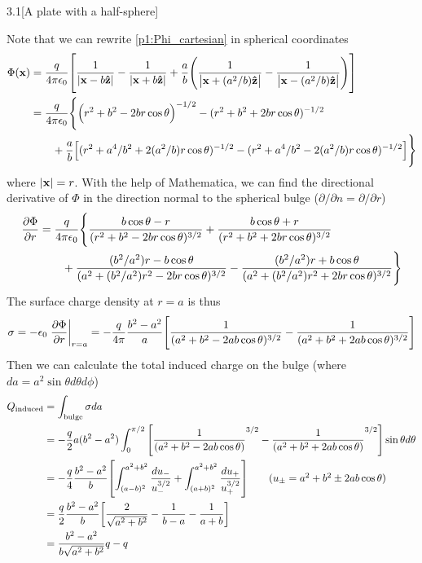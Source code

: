 \documentclass[12pt]{article}
\begin{document}
\begin{problem}{3.1}[A plate with a half-sphere]
\begin{solution}
Note that we can rewrite \eqref{p1:Phi_cartesian} in spherical coordinates
\begin{align}
    \Phi(\vb{x})&=\frac{q}{4\pi\epsilon_0}\qty[
        \frac1{\abs{\vb{x}-b\vb{\hat{z}}}}-\frac1{\abs{\vb{x}+b\vb{\hat{z}}}}
        +\frac{a}{b}\qty(
            \frac{1}{\abs{\vb{x}+(a^2/b)\vb{\hat{z}}}}
            -\frac{1}{\abs{\vb{x}-(a^2/b)\vb{\hat{z}}}}
        )
    ]\notag\\
    &=\frac{q}{4\pi\epsilon_0}\Bigg\{
        \qty(r^2+b^2-2br\cos\theta)^{-1/2}-(r^2+b^2+2br\cos\theta)^{-1/2}\notag\\
    &\qquad+\frac{a}{b}\qty[
        (r^2+a^4/b^2+2(a^2/b)r\cos\theta)^{-1/2}
        -(r^2+a^4/b^2-2(a^2/b)r\cos\theta)^{-1/2}
    ]
    \Bigg\}
\end{align}
where $\abs{\vb{x}}=r$. With the help of Mathematica, we can find the
directional derivative of $\Phi$ in the direction normal to the spherical bulge
($\partial/\partial n=\partial/\partial r$)
\begin{align}
    \frac{\partial\Phi}{\partial r}&=\frac{q}{4\pi\epsilon_0}\Bigg\{
        \frac{b\cos\theta-r}{(r^2+b^2-2br\cos\theta)^{3/2}}
        +\frac{b\cos\theta+r}{(r^2+b^2+2br\cos\theta)^{3/2}}\notag\\
       &\qquad+\frac{(b^2/a^2)r-b\cos\theta}{(a^2+(b^2/a^2)r^2-2br\cos\theta)^{3/2}}
        -\frac{(b^2/a^2)r+b\cos\theta}{(a^2+(b^2/a^2)r^2+2br\cos\theta)^{3/2}}
    \Bigg\}
\end{align}
The surface charge density at $r=a$ is thus
\begin{equation}
    \sigma=-\epsilon_0\eval{\frac{\partial\Phi}{\partial r}}_{r=a}
    =-\frac{q}{4\pi}\frac{b^2-a^2}{a}\qty[\frac1{(a^2+b^2-2ab\cos\theta)^{3/2}}-\frac1{(a^2+b^2+2ab\cos\theta)^{3/2}}]
\end{equation}
Then we can calculate the total induced charge on the bulge (where
$da=a^2\sin\theta d\theta d\phi$)
\begin{align}
    Q_{\text{induced}}
    &=\int_{\text{bulge}}\sigma da\notag\\
    &=-\frac{q}{2}a(b^2-a^2)\int_0^{\pi/2}\qty[
    \frac1{(a^2+b^2-2ab\cos\theta)}^{3/2}
    -\frac1{(a^2+b^2+2ab\cos\theta)}^{3/2}
    ]\sin\theta d\theta\notag\\
    &=-\frac{q}{4}\frac{b^2-a^2}{b}\qty[\int_{(a-b)^2}^{a^2+b^2}\frac{du_-}{u_-^{3/2}}+\int_{(a+b)^2}^{a^2+b^2}\frac{du_+}{u_+^{3/2}}]\tag{$u_\pm=a^2+b^2\pm2ab\cos\theta$}\\
    &=\frac{q}{2}\frac{b^2-a^2}{b}\qty[\frac{2}{\sqrt{a^2+b^2}}-\frac1{b-a}-\frac{1}{a+b}]\notag\\
    &=\frac{b^2-a^2}{b\sqrt{a^2+b^2}}q-q
\end{align}
\end{solution}
\end{problem}
\end{document}
